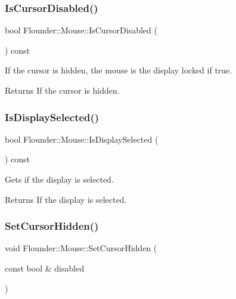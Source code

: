 \subsubsection{\texorpdfstring{Is\+Cursor\+Disabled()}{IsCursorDisabled()}}
{\footnotesize\ttfamily bool Flounder\+::\+Mouse\+::\+Is\+Cursor\+Disabled (\begin{DoxyParamCaption}{ }\end{DoxyParamCaption}) const\hspace{0.3cm}{\ttfamily [inline]}}



If the cursor is hidden, the mouse is the display locked if true. 

\begin{DoxyReturn}{Returns}
If the cursor is hidden. 
\end{DoxyReturn}
\mbox{\label{class_flounder_1_1_mouse_ad24ca606782a055db197563e573aec8f}} 
\subsubsection{\texorpdfstring{Is\+Display\+Selected()}{IsDisplaySelected()}}
{\footnotesize\ttfamily bool Flounder\+::\+Mouse\+::\+Is\+Display\+Selected (\begin{DoxyParamCaption}{ }\end{DoxyParamCaption}) const\hspace{0.3cm}{\ttfamily [inline]}}



Gets if the display is selected. 

\begin{DoxyReturn}{Returns}
If the display is selected. 
\end{DoxyReturn}
\mbox{\label{class_flounder_1_1_mouse_ae4155725ab7ffe123e58f006116c9e1c}} 
\subsubsection{\texorpdfstring{Set\+Cursor\+Hidden()}{SetCursorHidden()}}
{\footnotesize\ttfamily void Flounder\+::\+Mouse\+::\+Set\+Cursor\+Hidden (\begin{DoxyParamCaption}\item[{const bool \&}]{disabled }\end{DoxyParamCaption})}



